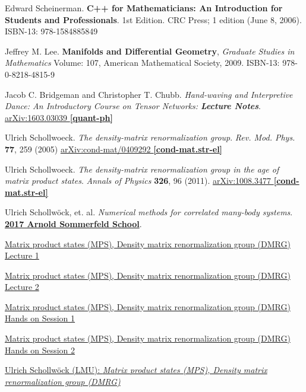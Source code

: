 \documentclass[10pt]{amsart}
\begin{document}
\begin{thebibliography}{9}
Edward Scheinerman.  \textbf{C++ for Mathematicians: An Introduction for Students and Professionals}. 1st Edition.  CRC Press; 1 edition (June 8, 2006).  ISBN-13: 978-1584885849 


Jeffrey M. Lee. \textbf{Manifolds and Differential Geometry}, \emph{Graduate Studies in Mathematics} Volume: 107, American Mathematical Society, 2009. ISBN-13: 978-0-8218-4815-9

Jacob C. Bridgeman and Christopher T. Chubb.  \emph{Hand-waving and Interpretive Dance: An Introductory Course on Tensor Networks: \textbf{Lecture Notes}}.  \href{https://arxiv.org/abs/1603.03039}{arXiv:1603.03039 \textbf{[quant-ph]}}

Ulrich Schollwoeck.  \emph{The density-matrix renormalization group}.   \emph{Rev. Mod. Phys.} \textbf{77}, 259 (2005)	\href{https://arxiv.org/abs/cond-mat/0409292}{arXiv:cond-mat/0409292 \textbf{[cond-mat.str-el]}}

Ulrich Schollwoeck.  \emph{The density-matrix renormalization group in the age of matrix product states}.  \emph{Annals of Physics} \textbf{326}, 96 (2011).  \href{https://arxiv.org/abs/1008.3477}{arXiv:1008.3477 \textbf{[cond-mat.str-el]}}

Ulrich Schollw\"{o}ck, et. al. \emph{Numerical methods for correlated many-body systems}. \href{https://www.asc.physik.lmu.de/activities/schools/archiv/asc_school_17/index.html}{\textbf{2017 Arnold Sommerfeld School}}. 

\href{https://cast.itunes.uni-muenchen.de/clips/WE0Gf4L6f3/vod/high_quality.mp4}{Matrix product states (MPS), Density matrix renormalization group (DMRG) Lecture 1} 

\href{https://cast.itunes.uni-muenchen.de/clips/1PTFIT1n42/vod/high_quality.mp4}{Matrix product states (MPS), Density matrix renormalization group (DMRG) Lecture 2} 

\href{https://cast.itunes.uni-muenchen.de/clips/uN8yxWC8m9/vod/high_quality.mp4}{Matrix product states (MPS), Density matrix renormalization group (DMRG) Hands on Session 1} 

\href{https://cast.itunes.uni-muenchen.de/clips/xJRe4DD7Fo/vod/high_quality.mp4}{Matrix product states (MPS), Density matrix renormalization group (DMRG) Hands on Session 2} 

\href{https://www.asc.physik.lmu.de/activities/schools/archiv/asc_school_17/extramaterial/schollwoeck_asc_1.pdf}{Ulrich Schollw\"{o}ck (LMU): \emph{Matrix product states (MPS), Density matrix renormalization group (DMRG)}}


\end{thebibliography}
\end{document}
